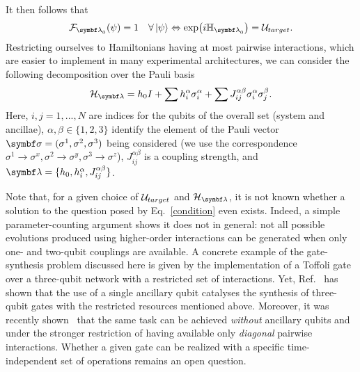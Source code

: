 It then follows that
\begin{equation}
\label{condition}
\calF_{\bslambda_0}(\psi)=1\quad \forall\ket\psi \Leftrightarrow \exp(i\HH_{\bslambda_0})=\Utarget.
\end{equation}
Restricting ourselves to Hamiltonians having at most pairwise interactions, which are easier to implement in many experimental architectures, we can consider the following decomposition over the Pauli basis
\begin{equation}
	\HLambda = h_0 I + \sum h^\alpha_{i} \sigma_i^\alpha + \sum J_{ij}^{\alpha\beta} \sigma_i^\alpha \sigma_j^\beta.
	\label{eq:hamiltonian_atmostpairwise}
\end{equation}
Here, $i, j=1,...,N$ are indices for the qubits of the overall set (system and ancillae), $\alpha, \beta\in\{1,2,3\}$ identify the element of the Pauli vector ${\bs\sigma}=(\sigma^1,\sigma^2,\sigma^3)$ being considered (we use the correspondence $\sigma^1\rightarrow\sigma^x, \sigma^2\rightarrow\sigma^y, \sigma^3\rightarrow\sigma^z$), $J_{ij}^{\alpha\beta}$ is a coupling strength, and $\bslambda=\{h_0, h^\alpha_{i}, J_{ij}^{\alpha\beta}\}$.

Note that, for a given choice of ${{\mathcal{U}}_{target}}$ and $\HLambda$, it is not known whether a solution to the question posed by Eq.~\eqref{condition} even exists.
Indeed, a simple parameter-counting argument shows it does not in general: not all possible evolutions produced using higher-order interactions can be generated when only one- and two-qubit couplings are available. A concrete example of the gate-synthesis problem discussed here is given by the implementation of a Toffoli gate~\cite{shi2002both} over a three-qubit network with a restricted set of interactions. Yet, Ref.~\cite{banchi2016quantum} has shown that the use of a single ancillary qubit catalyses the synthesis of three-qubit gates with the restricted resources mentioned above. Moreover,  it was recently shown~\cite{innocenti2018supervised} that the same task can be achieved \emph{without} ancillary qubits and under the stronger restriction of having available only \emph{diagonal} pairwise interactions. Whether a given gate can be realized with a specific time-independent set of operations remains an open question.

